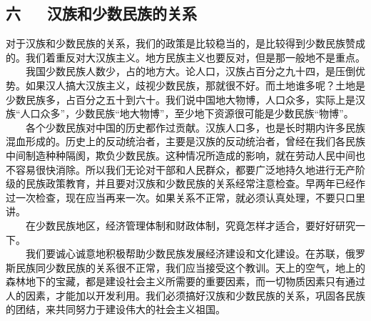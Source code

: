 \documentclass[cn,11pt,chinese]{elegantbook}
\def\myformat#1{\hfil\hfil #1}
\begin{document}
\subsection*{\myformat{六 　  汉族和少数民族的关系}}
对于汉族和少数民族的关系，我们的政策是比较稳当的，是比较得到少数民族赞成的。我们着重反对大汉族主义。地方民族主义也要反对，但是那一般地不是重点。\\
　　我国少数民族人数少，占的地方大。论人口，汉族占百分之九十四，是压倒优势。如果汉人搞大汉族主义，歧视少数民族，那就很不好。而土地谁多呢？土地是少数民族多，占百分之五十到六十。我们说中国地大物博，人口众多，实际上是汉族“人口众多”，少数民族“地大物博”，至少地下资源很可能是少数民族“物博”。\\
　　各个少数民族对中国的历史都作过贡献。汉族人口多，也是长时期内许多民族混血形成的。历史上的反动统治者，主要是汉族的反动统治者，曾经在我们各民族中间制造种种隔阂，欺负少数民族。这种情况所造成的影响，就在劳动人民中间也不容易很快消除。所以我们无论对干部和人民群众，都要广泛地持久地进行无产阶级的民族政策教育，并且要对汉族和少数民族的关系经常注意检查。早两年已经作过一次检查，现在应当再来一次。如果关系不正常，就必须认真处理，不要只口里讲。\\
　　在少数民族地区，经济管理体制和财政体制，究竟怎样才适合，要好好研究一下。\\
　　我们要诚心诚意地积极帮助少数民族发展经济建设和文化建设。在苏联，俄罗斯民族同少数民族的关系很不正常，我们应当接受这个教训。天上的空气，地上的森林地下的宝藏，都是建设社会主义所需要的重要因素，而一切物质因素只有通过人的因素，才能加以开发利用。我们必须搞好汉族和少数民族的关系，巩固各民族的团结，来共同努力于建设伟大的社会主义祖国。\\
\end{document}
